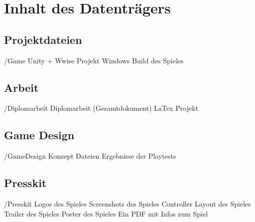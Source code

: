 \chapter{Inhalt des Datenträgers}

\section{Projektdateien}
\begin{FileList}{/Game}
	 Unity + Wwise Projekt
	 Windows Build des Spieles
\end{FileList}

\section{Arbeit}
\begin{FileList}{/Diplomarbeit}
	 Diplomarbeit (Gesamtdokument) 
	 LaTex Projekt
\end{FileList}

\section{Game Design}
\begin{FileList}{/GameDesign}
	 Konzept Dateien
	 Ergebnisse der Playtests
\end{FileList}
 
\section{Presskit}
\begin{FileList}{/Presskit}
	 Logos des Spieles
	 Screenshots des Spieles
	 Controller Layout des Spieles
	 Trailer des Spieles
	 Poster des Spieles
	 Ein PDF mit Infos zum Spiel
\end{FileList}
